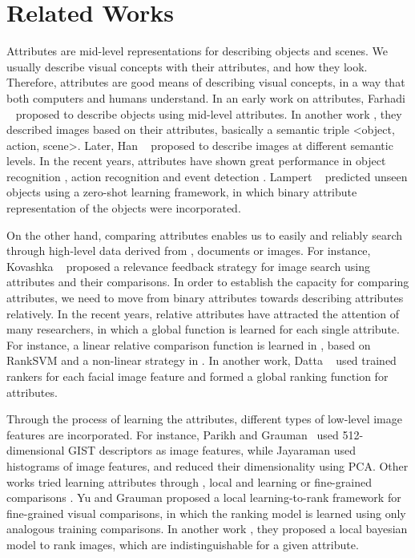 

\section{Related Works}
\label{sec.2}

Attributes are mid-level representations for describing objects and scenes. We usually describe visual concepts with their attributes, and how they look. Therefore, attributes are good means of describing visual concepts, in a way that both computers and humans understand. In an early work on attributes, Farhadi \etal~\cite{Farhadi09describingobjects} proposed to describe objects using mid-level attributes. In another work \cite{farhadi10}, they described images based on their attributes, basically a semantic triple <object, action, scene>. Later, Han \etal~\cite{6739133} proposed to describe images at different semantic levels. In the recent years, attributes have shown great performance in object recognition \cite{Farhadi09describingobjects,7298613}, action recognition \cite{6838985,5995353} and event detection \cite{6475038}. Lampert \etal~\cite{6571196} predicted unseen objects using a zero-shot learning framework, in which binary attribute representation of the objects were incorporated. 

On the other hand, comparing attributes enables us to easily and reliably search through high-level data derived from \eg, documents or images. For instance, Kovashka \etal~\cite{KovashkaG13} proposed a relevance feedback strategy for image search using attributes and their comparisons. In order to establish the capacity for comparing attributes, we need to move from binary attributes towards describing attributes relatively. In the recent years, relative attributes have attracted the attention of many researchers, in which a global function is learned for each single attribute. For instance, a linear relative comparison function is learned in \cite{parikh2011}, based on RankSVM \cite{Joachims2002} and a non-linear strategy in \cite{Li2013}. In another work, Datta \etal~\cite{5771429} used trained rankers for each facial image feature and formed a global ranking function for attributes.

Through the process of learning the attributes, different types of low-level image features are incorporated. For instance, Parikh and Grauman~\cite{parikh2011} used 512-dimensional GIST \cite{Aude01} descriptors as image features, while Jayaraman \etal\cite{6909607} used histograms of image features, and reduced their dimensionality using PCA. Other works tried learning attributes through \eg, local and learning \cite{1641014} or fine-grained comparisons \cite{Yu2014}. Yu and Grauman \cite{Yu2014} proposed a local learning-to-rank framework for fine-grained visual comparisons, in which the ranking model is learned using only analogous training comparisons. In another work \cite{Yu2015}, they proposed a local bayesian model to rank images, which are indistinguishable for a given attribute. 

